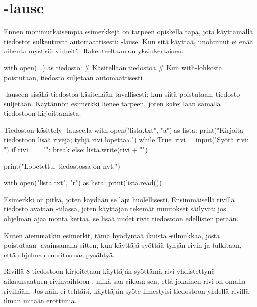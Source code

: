 \section{-lause}

Ennen monimutkaisempia esimerkkejä on tarpeen opiskella tapa, jota käyttämällä tiedostot sulkeutuvat automaattisesti: -lause. Kun sitä käyttää, unohtunut  ei enää aiheuta mystisiä virheitä. Rakenteeltaan  on yksinkertainen.

\begin{python}
with open(...) as tiedosto:
	# Käsitellään tiedostoa
# Kun with-lohkosta poistutaan, tiedosto suljetaan automaattisesti
\end{python}

-lauseen sisällä tiedostoa käsitellään tavallisesti; kun siitä poistutaan, tiedosto suljetaan. Käytännön esimerkki lienee tarpeen, joten kokeillaan samalla tiedostoon kirjoittamista.

\begin{example}{Tiedoston käsittely -lauseella}
with open("lista.txt", "a") as lista:
        print("Kirjoita tiedostoon lisää rivejä; tyhjä rivi lopettaa.")
        while True:
                rivi = input("Syötä rivi: ")
                if rivi == "":
                        break
                else:
                        lista.write(rivi + "\n")

print("Lopetettu, tiedostossa on nyt:")

with open("lista.txt", "r") as lista:
        print(lista.read())
\end{example}

Esimerkki on pitkä, joten käydään se läpi huolellisesti. Ensimmäisellä rivillä tiedosto avataan -tilassa, joten käyttäjän tekemät muutokset säilyvät: jos ohjelman ajaa monta kertaa, se lisää uudet rivit tiedostoon edellisten perään.

Kuten aiemmatkin esimerkit, tämä hyödyntää ikuista -silmukkaa, josta poistutaan -avainsanalla sitten, kun käyttäjä syöttää tyhjän rivin ja tulkitaan, että ohjelman suoritus saa pysähtyä.

Rivillä 8 tiedostoon kirjoitetaan käyttäjän syöttämä rivi yhdistettynä  aikaansaatuun rivinvaihtoon , mikä saa aikaan sen, että jokainen rivi on omalla rivillään. Jos näin ei tehtäisi, käyttäjän syöte ilmestyisi tiedostoon yhdellä rivillä ilman mitään erottimia.

